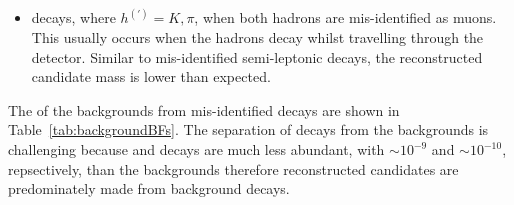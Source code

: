 \begin{itemize}
\item \bhh decays, where $ h^{(')}  = K, \pi$, when both hadrons are mis-identified as muons. This usually occurs when the hadrons decay whilst travelling through the detector. Similar to mis-identified semi-leptonic decays, the reconstructed \bsd candidate mass is lower than expected. %
\end{itemize}

The \BFs of the backgrounds from mis-identified decays are shown in Table~\ref{tab:backgroundBFs}. The separation of \bmumu decays from the backgrounds is challenging because \bsmumu and \bsmumu decays are much less abundant, with \BFs $\sim 10^{-9}$ and $\sim10^{-10}$, repsectively, than the backgrounds therefore reconstructed candidates are predominately made from background decays.

